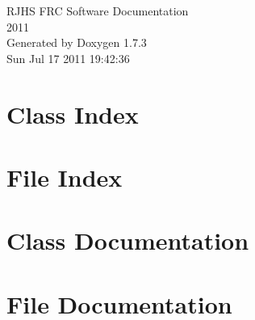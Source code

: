 \documentclass[letterpaper]{book}
\begin{document}
\hypersetup{pageanchor=false}
\begin{titlepage}
\vspace*{7cm}
\begin{center}
{\Large RJHS FRC Software Documentation \\[1ex]\large 2011 }\\
\vspace*{1cm}
{\large Generated by Doxygen 1.7.3}\\
\vspace*{0.5cm}
{\small Sun Jul 17 2011 19:42:36}\\
\end{center}
\end{titlepage}
\clearemptydoublepage
{}
\tableofcontents
\clearemptydoublepage
{}
\hypersetup{pageanchor=true}
\chapter{Class Index}

\chapter{File Index}

\chapter{Class Documentation}






\chapter{File Documentation}














\printindex
\end{document}
